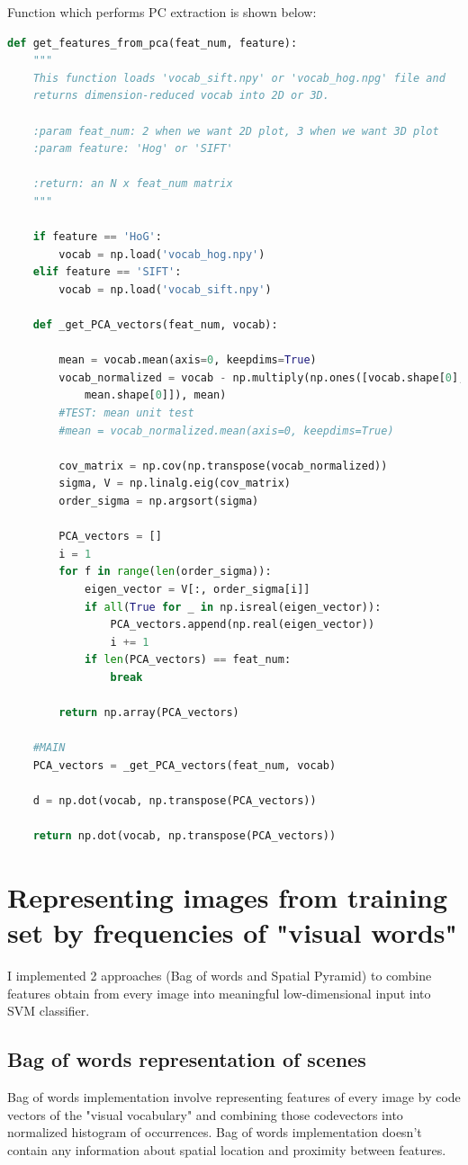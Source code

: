 Function which performs PC extraction is shown below:
\begin{lstlisting}[language=Python]
def get_features_from_pca(feat_num, feature):
    """
    This function loads 'vocab_sift.npy' or 'vocab_hog.npg' file and
    returns dimension-reduced vocab into 2D or 3D.

    :param feat_num: 2 when we want 2D plot, 3 when we want 3D plot
    :param feature: 'Hog' or 'SIFT'

    :return: an N x feat_num matrix
    """

    if feature == 'HoG':
        vocab = np.load('vocab_hog.npy')
    elif feature == 'SIFT':
        vocab = np.load('vocab_sift.npy')

    def _get_PCA_vectors(feat_num, vocab):

        mean = vocab.mean(axis=0, keepdims=True)
        vocab_normalized = vocab - np.multiply(np.ones([vocab.shape[0], 
            mean.shape[0]]), mean)
        #TEST: mean unit test
        #mean = vocab_normalized.mean(axis=0, keepdims=True)

        cov_matrix = np.cov(np.transpose(vocab_normalized))
        sigma, V = np.linalg.eig(cov_matrix)
        order_sigma = np.argsort(sigma)

        PCA_vectors = []
        i = 1
        for f in range(len(order_sigma)):
            eigen_vector = V[:, order_sigma[i]]
            if all(True for _ in np.isreal(eigen_vector)):
                PCA_vectors.append(np.real(eigen_vector))
                i += 1
            if len(PCA_vectors) == feat_num:
                break

        return np.array(PCA_vectors)

    #MAIN
    PCA_vectors = _get_PCA_vectors(feat_num, vocab)

    d = np.dot(vocab, np.transpose(PCA_vectors))

    return np.dot(vocab, np.transpose(PCA_vectors))
\end{lstlisting}

\section*{Representing images from training set by frequencies of "visual words"}
I implemented 2 approaches (Bag of words and Spatial Pyramid) to combine features obtain from every image into meaningful low-dimensional input into SVM classifier.

    \subsection*{Bag of words representation of scenes}
Bag of words implementation involve representing features of every image by code vectors of the "visual vocabulary" and combining those codevectors into normalized histogram of occurrences. Bag of words implementation doesn't contain any information about spatial location and proximity between features.

